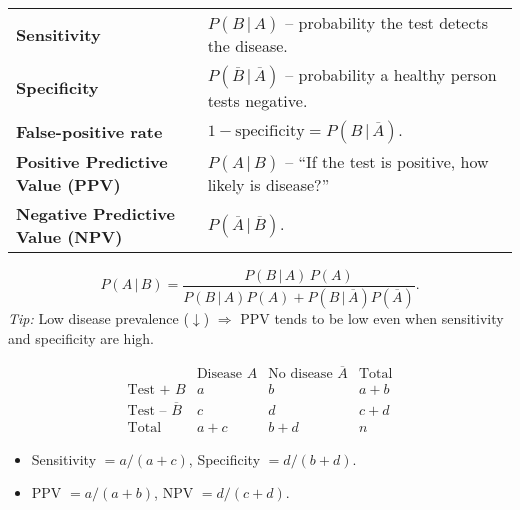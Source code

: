 \documentclass[12pt]{book}
\begin{document}
\begin{itemize}
\begin{tabular}{@{}ll@{}}
\textbf{Sensitivity} & $P(B\,|\,A)$          – probability the test detects the disease.\\
\textbf{Specificity} & $P(\overline{B}\,|\,\overline{A})$ – probability a healthy person tests negative.\\
\textbf{False-positive rate} & $1-\text{specificity}=P(B\,|\,\overline{A})$.\\
\textbf{Positive Predictive Value (PPV)} & $P(A\,|\,B)$ – “If the test is positive, how likely is disease?”\\
\textbf{Negative Predictive Value (NPV)} & $P(\overline{A}\,|\,\overline{B})$.\\
\end{tabular}

\[
  P(A\,|\,B)=\frac{P(B\,|\,A)\,P(A)}{P(B\,|\,A)P(A)+P(B\,|\,\overline{A})P(\overline{A})}.
\]
\emph{Tip:} Low disease prevalence ($\downarrow$) $\Rightarrow$ PPV tends to be low even when sensitivity and specificity are high.

\[
\begin{array}{c|cc|c}
           & \text{Disease }A & \text{No disease }\overline{A} & \text{Total} \\ \hline
\text{Test + }B     & a & b & a+b \\
\text{Test – }\overline{B} & c & d & c+d \\ \hline
\text{Total} & a+c & b+d & n
\end{array}
\]
\begin{itemize}
  \item Sensitivity $=a/(a+c)$,\; Specificity $=d/(b+d)$.
  \item PPV $=a/(a+b)$,\; NPV $=d/(c+d)$.
\end{itemize}

\end{itemize}


\end{document}
